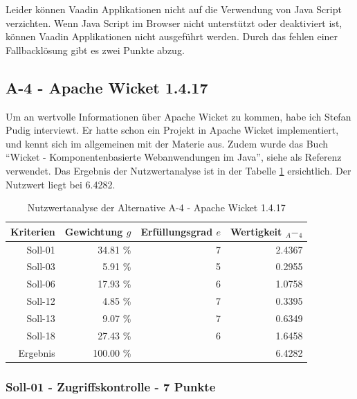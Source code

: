   Leider können Vaadin Applikationen nicht auf die Verwendung von Java
  Script verzichten. Wenn Java Script im Browser nicht unterstützt oder
  deaktiviert ist, können Vaadin Applikationen nicht ausgeführt werden. Durch
  das fehlen einer Fallbacklösung gibt es zwei Punkte abzug.
  
  \subsection{A-4 - Apache Wicket 1.4.17}
  
  Um an wertvolle Informationen über Apache Wicket zu kommen, habe ich Stefan
  Pudig interviewt. Er hatte schon ein Projekt in Apache Wicket implementiert,
  und kennt sich im allgemeinen mit der Materie aus. Zudem wurde das Buch
  ``Wicket - Komponentenbasierte Webanwendungen im Java'', siehe \cite{Wicket} als
  Referenz verwendet. Das Ergebnis der Nutzwertanalyse ist in der Tabelle
  \ref{tab:nwaA4} ersichtlich. Der Nutzwert liegt bei 6.4282.
  
  \begin{table}[ht]
    \sffamily 
    \begin{center}
      \begin{tabular}{r|rrr}
        \toprule
        Kriterien & Gewichtung \(g\) & Erfüllungsgrad \(e\) & Wertigkeit
        \(_A-_4\) \\
        \midrule
        Soll-01   & 34.81 \% & 7 & 2.4367 \\
        Soll-03   &  5.91 \% & 5 & 0.2955 \\
        Soll-06   & 17.93 \% & 6 & 1.0758 \\
        Soll-12   &  4.85 \% & 7 & 0.3395 \\
        Soll-13   &  9.07 \% & 7 & 0.6349 \\
        Soll-18   & 27.43 \% & 6 & 1.6458 \\
        \midrule
        \midrule
        Ergebnis  & 100.00 \% &   & 6.4282 \\
        \bottomrule
      \end{tabular}
      \caption{Nutzwertanalyse der Alternative A-4 - Apache Wicket 1.4.17}
      \label{tab:nwaA4}
    \end{center}
  \end{table}
  
  \subsubsection{Soll-01 - Zugriffskontrolle - 7 Punkte}
  
